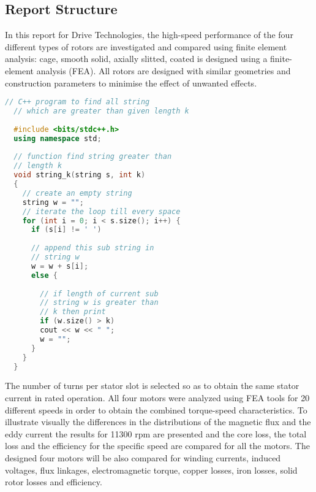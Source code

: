 \subsection{Report Structure} %

In this report for Drive Technologies, the high-speed performance of the four
different types of rotors are investigated and compared using finite element analysis:
cage, smooth solid, axially slitted, coated is designed using a finite-element
analysis (FEA). All rotors are designed with similar geometries and construction parameters
to minimise the effect of unwanted effects.

\begin{lstlisting}[language=C++]  
  // C++ program to find all string
  // which are greater than given length k 
  
  #include <bits/stdc++.h> 
  using namespace std;
  
  // function find string greater than
  // length k
  void string_k(string s, int k) 
  {
    // create an empty string
    string w = "";
    // iterate the loop till every space
    for (int i = 0; i < s.size(); i++) {
      if (s[i] != ' ')
      
      // append this sub string in
      // string w
      w = w + s[i];
      else {
        
        // if length of current sub
        // string w is greater than 
        // k then print
        if (w.size() > k)
        cout << w << " "; 
        w = "";
      }
    }
  }
\end{lstlisting}

The number of turns per stator slot is selected so as to obtain the
same stator current in rated operation. All four motors were analyzed using FEA
tools for 20 different speeds in order to obtain the combined torque-speed
characteristics. To illustrate visually the differences in the distributions of the
magnetic flux and the eddy current the results for 11300 rpm are presented and the
core loss, the total loss and the efficiency for the specific speed are compared for all
the motors. The designed four motors will be also compared for winding currents,
induced voltages, flux linkages, electromagnetic torque, copper losses, iron losses,
solid rotor losses and efficiency.



